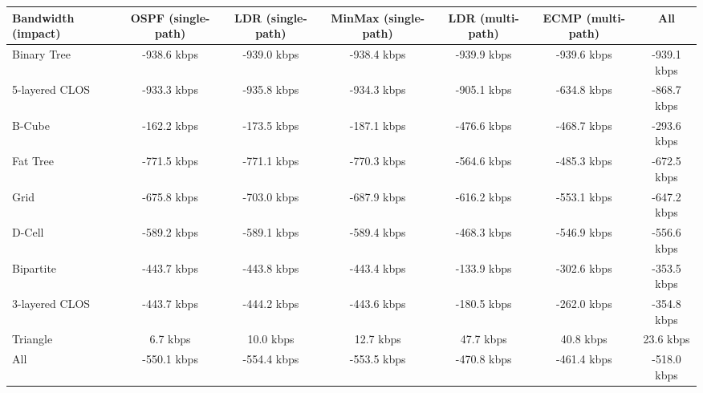 \begin{tabular}{l|cccccc}
Bandwidth (impact) & OSPF (single-path) & LDR (single-path) & MinMax (single-path) & LDR (multi-path) & ECMP (multi-path) & All         \\
\hline
Binary Tree        & -938.6 kbps        & -939.0 kbps       & -938.4 kbps          & -939.9 kbps      & -939.6 kbps       & -939.1 kbps \\
5-layered CLOS     & -933.3 kbps        & -935.8 kbps       & -934.3 kbps          & -905.1 kbps      & -634.8 kbps       & -868.7 kbps \\
B-Cube             & -162.2 kbps        & -173.5 kbps       & -187.1 kbps          & -476.6 kbps      & -468.7 kbps       & -293.6 kbps \\
Fat Tree           & -771.5 kbps        & -771.1 kbps       & -770.3 kbps          & -564.6 kbps      & -485.3 kbps       & -672.5 kbps \\
Grid               & -675.8 kbps        & -703.0 kbps       & -687.9 kbps          & -616.2 kbps      & -553.1 kbps       & -647.2 kbps \\
D-Cell             & -589.2 kbps        & -589.1 kbps       & -589.4 kbps          & -468.3 kbps      & -546.9 kbps       & -556.6 kbps \\
Bipartite          & -443.7 kbps        & -443.8 kbps       & -443.4 kbps          & -133.9 kbps      & -302.6 kbps       & -353.5 kbps \\
3-layered CLOS     & -443.7 kbps        & -444.2 kbps       & -443.6 kbps          & -180.5 kbps      & -262.0 kbps       & -354.8 kbps \\
Triangle           & 6.7 kbps           & 10.0 kbps         & 12.7 kbps            & 47.7 kbps        & 40.8 kbps         & 23.6 kbps   \\
All                & -550.1 kbps        & -554.4 kbps       & -553.5 kbps          & -470.8 kbps      & -461.4 kbps       & -518.0 kbps \\
\end{tabular}